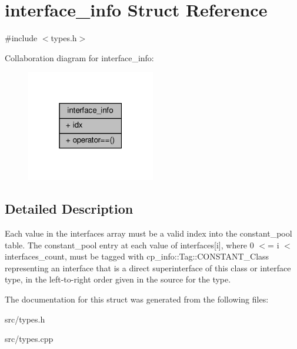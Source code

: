 \hypertarget{structinterface__info}{}\section{interface\+\_\+info Struct Reference}
\label{structinterface__info}


{\ttfamily \#include $<$types.\+h$>$}



Collaboration diagram for interface\+\_\+info\+:\nopagebreak
\begin{figure}[H]
\begin{center}
\leavevmode
\includegraphics[width=159pt]{structinterface__info__coll__graph}
\end{center}
\end{figure}


\subsection{Detailed Description}
Each value in the interfaces array must be a valid index into the constant\+\_\+pool table. The constant\+\_\+pool entry at each value of interfaces\mbox{[}i\mbox{]}, where 0 $<$= i $<$ interfaces\+\_\+count, must be tagged with cp\+\_\+info\+::\+Tag\+::\+C\+O\+N\+S\+T\+A\+N\+T\+\_\+\+Class representing an interface that is a direct superinterface of this class or interface type, in the left-\/to-\/right order given in the source for the type. 

The documentation for this struct was generated from the following files\+:\begin{DoxyCompactItemize}
\item 
src/types.\+h\item 
src/types.\+cpp\end{DoxyCompactItemize}
